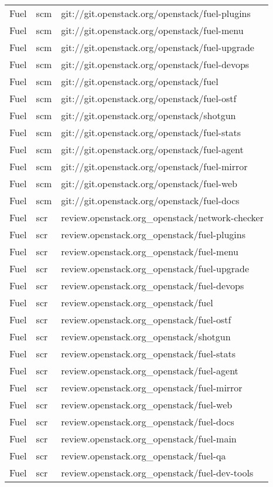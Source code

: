 \begin{center}
\begin{longtable}{|p{4cm}|p{1cm}|p{10cm}|}
Fuel&scm&git://git.openstack.org/openstack/fuel-plugins\\ 
Fuel&scm&git://git.openstack.org/openstack/fuel-menu\\ 
Fuel&scm&git://git.openstack.org/openstack/fuel-upgrade\\ 
Fuel&scm&git://git.openstack.org/openstack/fuel-devops\\ 
Fuel&scm&git://git.openstack.org/openstack/fuel\\ 
Fuel&scm&git://git.openstack.org/openstack/fuel-ostf\\ 
Fuel&scm&git://git.openstack.org/openstack/shotgun\\ 
Fuel&scm&git://git.openstack.org/openstack/fuel-stats\\ 
Fuel&scm&git://git.openstack.org/openstack/fuel-agent\\ 
Fuel&scm&git://git.openstack.org/openstack/fuel-mirror\\ 
Fuel&scm&git://git.openstack.org/openstack/fuel-web\\ 
Fuel&scm&git://git.openstack.org/openstack/fuel-docs\\ 
Fuel&scr&review.openstack.org\_openstack/network-checker\\ 
Fuel&scr&review.openstack.org\_openstack/fuel-plugins\\ 
Fuel&scr&review.openstack.org\_openstack/fuel-menu\\ 
Fuel&scr&review.openstack.org\_openstack/fuel-upgrade\\ 
Fuel&scr&review.openstack.org\_openstack/fuel-devops\\ 
Fuel&scr&review.openstack.org\_openstack/fuel\\ 
Fuel&scr&review.openstack.org\_openstack/fuel-ostf\\ 
Fuel&scr&review.openstack.org\_openstack/shotgun\\ 
Fuel&scr&review.openstack.org\_openstack/fuel-stats\\ 
Fuel&scr&review.openstack.org\_openstack/fuel-agent\\ 
Fuel&scr&review.openstack.org\_openstack/fuel-mirror\\ 
Fuel&scr&review.openstack.org\_openstack/fuel-web\\ 
Fuel&scr&review.openstack.org\_openstack/fuel-docs\\ 
Fuel&scr&review.openstack.org\_openstack/fuel-main\\ 
Fuel&scr&review.openstack.org\_openstack/fuel-qa\\ 
Fuel&scr&review.openstack.org\_openstack/fuel-dev-tools\\ 

\end{longtable}
\end{center}

